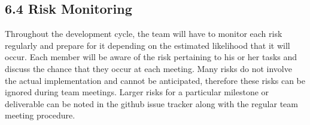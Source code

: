 \documentclass[]{article}
\begin{document}
\subsection{6.4 Risk Monitoring}\label{risk-monitoring}

Throughout the development cycle, the team will have to monitor each
risk regularly and prepare for it depending on the estimated likelihood
that it will occur. Each member will be aware of the risk pertaining to
his or her tasks and discuss the chance that they occur at each meeting.
Many risks do not involve the actual implementation and cannot be
anticipated, therefore these risks can be ignored during team meetings.
Larger risks for a particular milestone or deliverable can be noted in
the github issue tracker along with the regular team meeting procedure.
\end{document}
